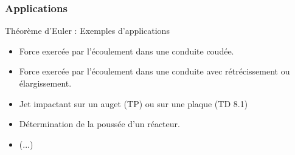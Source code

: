 \subsubsection{Applications}
\begin{frame}{Théorème d'Euler : Exemples d'applications}

\small

\begin{itemize}



\item
	Force exercée par  l'écoulement dans une conduite coudée.
	
	\item
	Force exercée par l'écoulement dans une conduite avec rétrécissement ou élargissement.

	\item
	Jet impactant sur un auget (TP) ou sur une plaque (TD 8.1)
\item
	Détermination de la poussée d'un réacteur.
	
\item (...)	

\end{itemize}

\vspace{30mm}

\end{frame}



